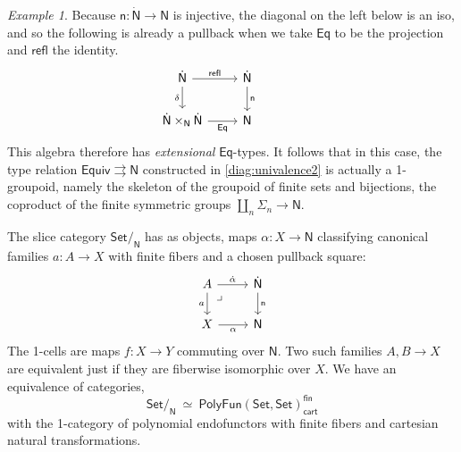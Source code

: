\documentclass[12pt,reqno]{amsart}
\newcommand{\N}{\ensuremath{\mathbb{N}}}
\newcommand{\Set}{\ensuremath{\mathsf{Set}}}
\renewcommand{\to}{\ensuremath{\rightarrow}}
\newcommand{\tto}{\ensuremath{\rightrightarrows}}
\newcommand{\refl}{\mathsf{refl}}
\newcommand{\n}{\ensuremath{\mathsf{n}}}
\renewcommand{\N}{\ensuremath{\mathsf{N}}}
\newcommand{\NN}{\ensuremath{\dot{\mathsf{N}}}}
\newcommand{\pbcorner}{\arrow[dr,phantom,"\lrcorner" very near start, shift right=.5ex]} %
\theoremstyle{remark}
\newtheorem{example}[theorem]{Example}
\theoremstyle{definition}
\begin{document}
\begin{example}
Because $\n : \NN \to \N$ is injective, the diagonal on the left below is an iso, and so the following is already a pullback when we take $\mathsf{Eq}$ to be the projection and $\refl$ the identity.
 \begin{equation*}\label{diag:EqtypesN}
\begin{tikzcd}
	\NN \ar[r,"\refl"] \ar[d,swap,"\delta"] &  \NN \ar[d, "\n"]\\  
	\NN \times_\N \NN \ar[r, swap,"\mathsf{Eq}"] & \N
 \end{tikzcd}\qquad \qquad 
 \end{equation*}
This algebra therefore has \emph{extensional} $\mathsf{Eq}$-types. 
It follows that in this case, the type relation $\mathsf{Equiv} \tto \N$ constructed in \eqref{diag:univalence2} is actually a 1-groupoid, namely the skeleton of the groupoid of finite sets and bijections, the coproduct of the finite symmetric groups $\coprod_n\Sigma_n\to\N$. 

The slice category $\Set/_\N$ has as objects, maps $\alpha: X\to \N$ classifying canonical families  $a :A \to X$ with finite fibers and a chosen pullback square:
\begin{equation}\label{eq:classifiedfamiliesN}
\begin{tikzcd}
	 A \ar[d, swap, "a"] \pbcorner \ar[r, "\dot{\alpha}"] & \NN \ar[d, "\n"] \\  
	X \ar[r, swap, "\alpha"] & \N 
 \end{tikzcd}
 \end{equation}
 The 1-cells are maps $f : X\to Y$ commuting over $\N$.  Two such families $A, B \to X$ are equivalent just if they are fiberwise isomorphic over $X$.  We have an equivalence of categories,
\[
\Set/_\N\ \simeq\ \mathsf{PolyFun}(\Set, \Set)_{\mathsf{cart}}^\mathsf{fin}
\]
with the 1-category of polynomial endofunctors with finite fibers and cartesian natural transformations.  
 


\end{example}
\end{document}
